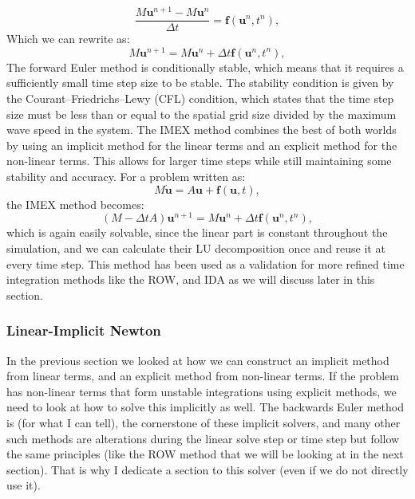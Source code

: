 \begin{equation}
    \frac{M\mathbf{u}^{n+1} - M\mathbf{u}^n}{\Delta t}= \mathbf{f}(\mathbf{u}^{n},t^{n}),
\end{equation}
Which we can rewrite as:
\begin{equation}
M\mathbf{u}^{n+1} = M\mathbf{u}^{n} + \Delta t \mathbf{f}(\mathbf{u}^{n},t^{n}),
\end{equation}
The forward Euler method is conditionally stable, which means that it requires a sufficiently small time step size to be stable. The stability condition is given by the Courant--Friedrichs--Lewy (CFL) condition, which states that the time step size must be less than or equal to the spatial grid size divided by the maximum wave speed in the system. The IMEX method combines the best of both worlds by using an implicit method for the linear terms and an explicit method for the non-linear terms. This allows for larger time steps while still maintaining some stability and accuracy. For a problem written as:
\begin{equation}
M\dot{\mathbf{u}} = A\mathbf{u} + \mathbf{f}(\mathbf{u},t),
\end{equation}
the IMEX method becomes:
\begin{equation}
(M-\Delta t A)\mathbf{u}^{n+1} = M\mathbf{u}^{n} + \Delta t \mathbf{f}(\mathbf{u}^{n},t^{n}),
\end{equation}
which is again easily solvable, since the linear part is constant throughout the simulation, and we can calculate their LU decomposition once and reuse it at every time step. This method has been used as a validation for more refined time integration methods like the ROW, and IDA as we will discuss later in this section.

\subsubsection{Linear-Implicit Newton}

In the previous section we looked at how we can construct an implicit method from linear terms, and an explicit method from non-linear terms. If the problem has non-linear terms that form unstable integrations using explicit methods, we need to look at how to solve this implicitly as well. The backwards Euler method is (for what I can tell), the cornerstone of these implicit solvers, and many other such methods are alterations during the linear solve step or time step but follow the same principles (like the ROW method that we will be looking at in the next section). That is why I dedicate a section to this solver (even if we do not directly use it).

